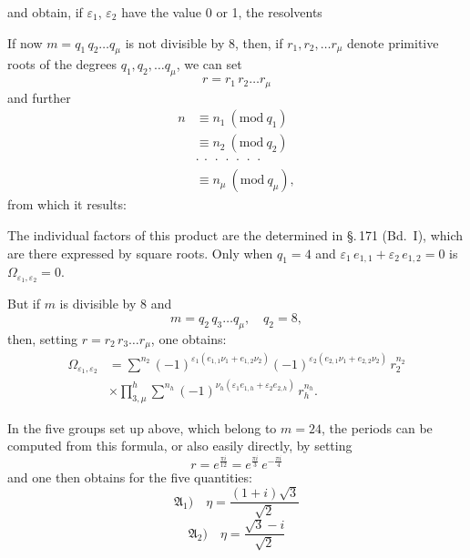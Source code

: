 and obtain, if $\varepsilon_1$, $\varepsilon_2$ have the value 0 or 1, the resolvents


If now $m = q_1\, q_2 \ldots q_\mu$ is not divisible by 8, then, if $r_1, r_2, \ldots r_\mu$
denote primitive roots of the degrees $q_1, q_2, \ldots q_\mu$, we can
set
\[ r = r_1\, r_2 \ldots r_\mu \]
and further
\[ \begin{aligned}
n &\equiv n_1\ (\mathrm{mod}\ q_1)\\
&\equiv n_2\ (\mathrm{mod}\ q_2)\\
&\cdot\ \cdot\ \cdot\ \cdot\ \cdot\ \cdot\ \cdot\\
&\equiv n_\mu\ (\mathrm{mod}\ q_\mu),
\end{aligned} \]
from which it results:

The individual factors of this product are the 
determined in \S.\,171 (Bd.\ I), which are there expressed by
square roots. Only when $q_1 = 4$ and
$\varepsilon_1\, e_{1,1} + \varepsilon_2\, e_{1,2} = 0$ is $\Omega_{\varepsilon_1,\varepsilon_2} = 0$. %

But if $m$ is divisible by 8 and
\[ m = q_2\, q_3 \ldots q_\mu, \quad q_2 = 8, \]
then, setting $r = r_2\, r_3 \ldots r_\mu$, one obtains:
\[ \begin{aligned}
\Omega_{\varepsilon_1,\varepsilon_2} &= \sum^{n_2} (-1)^{\varepsilon_1(e_{1,1}\nu_1+e_{1,2}\nu_2)}(-1)^{\varepsilon_2(e_{2,1}\nu_1+e_{2,2}\nu_2)}\, r_2^{n_2}\\
&\times \prod_{3,\mu}^{h} \sum^{n_h} (-1)^{\nu_h(\varepsilon_1 e_{1,h}+\varepsilon_2 e_{2,h})}\, r_h^{n_h}.
\end{aligned} \]

In the five groups set up above, which belong to $m = 24$,
the periods can be computed from this formula, or also
easily directly, by setting
\[ r = e^{\frac{\pi i}{12}} = e^{\frac{\pi i}{3}}\, e^{-\frac{\pi i}{4}} \]
and one then obtains for the five quantities:
\[ \mathfrak{A}_1)\quad \eta = \frac{(1+i)\sqrt{3}}{\sqrt{2}} \]
\[ \mathfrak{A}_2)\quad \eta = \frac{\sqrt{3}-i}{\sqrt{2}} \]
